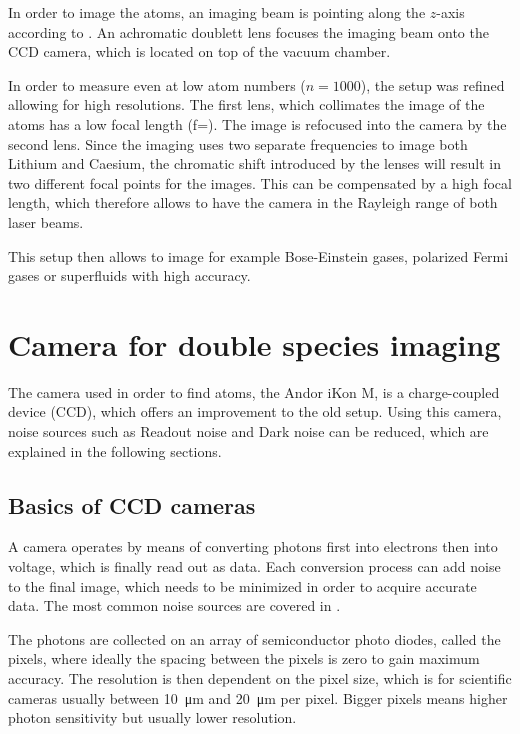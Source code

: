 In order to image the atoms, an imaging beam is pointing along the $z$-axis according to .
An achromatic doublett  lens focuses the imaging beam onto the CCD camera, which is located on top of the vacuum chamber.

In order to measure even at low atom numbers ($n=1000$), the setup was refined allowing for high resolutions. The first lens, which collimates the image of the atoms has a low focal length (f=).
The image is refocused into the camera by the second lens. Since the imaging uses two separate frequencies to image both Lithium and Caesium, the chromatic shift introduced by the lenses will result in two different focal points for the images. This can be compensated by a high focal length, which therefore allows to have the camera in the Rayleigh range of both laser beams.

This setup then allows to image for example Bose-Einstein gases, polarized Fermi gases or superfluids with high accuracy.


\section{Camera for double species imaging}
\label{ch:camera}
The camera used in order to find atoms, the Andor iKon M, is a charge-coupled device (CCD), which offers an improvement to the old setup. Using this camera, noise sources such as Readout noise and Dark noise can be reduced, which are explained in the following sections.

\subsection{Basics of CCD cameras}
\label{ch:ccd_basics}

A camera operates by means of converting photons first into electrons then into voltage, which is finally read out as data\cite{ccdoperationUrl}\cite{guppy38Bsheet}. Each conversion process can add noise to the final image, which needs to be minimized in order to acquire accurate data. The most common noise sources are covered in .

The photons are collected on an array of semiconductor photo diodes, called the pixels, where ideally the spacing between the pixels is zero to gain maximum accuracy. The resolution is then dependent on the pixel size, which is for scientific cameras usually between \SI{10}{\micro\meter} and \SI{20}{\micro\meter} per pixel. Bigger pixels means higher photon sensitivity but usually lower resolution.

